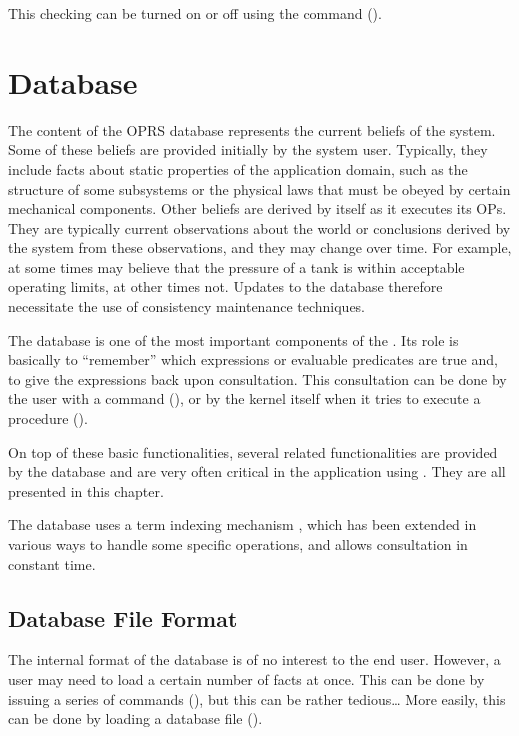 This checking can be turned on or off using the 
command ().

\chapter{Database}

The content of the OPRS database represents the current beliefs of the
system. Some of these beliefs are provided initially by the system user.
Typically, they include facts about static properties of the application
domain, such as the structure of some subsystems or the physical laws that
must be obeyed by certain mechanical components. Other beliefs are derived
by \COPRS{} itself as it executes its OPs. They are typically current
observations about the world or conclusions derived by the system from
these observations, and they may change over time. For example, at some
times \COPRS{} may believe that the pressure of a tank is within acceptable
operating limits, at other times not. Updates to the database therefore
necessitate the use of consistency maintenance techniques.

The database is one of the most important components of the \CPK{}.
Its role is basically to ``remember'' which expressions or
evaluable predicates are true and, to give the expressions back upon
consultation. This consultation can be done by the user with
a  command (), or
by the kernel itself when it tries to execute a procedure
().

On top of these basic functionalities, several related
functionalities are provided by the database and are very often
critical in the application using \COPRS. They are all presented in this
chapter.

The database uses a term indexing mechanism \cite{Stieckel}, which has
been extended in various ways to handle some specific operations, and allows
consultation in constant time.



\section{Database File Format}

The internal format of the database is of no interest to the end user.
However, a user may need to load a certain number of facts at once. This can be
done by issuing a series of  commands (), but this can be rather tedious\dots{} More easily, this
can be done by loading a database file ().

